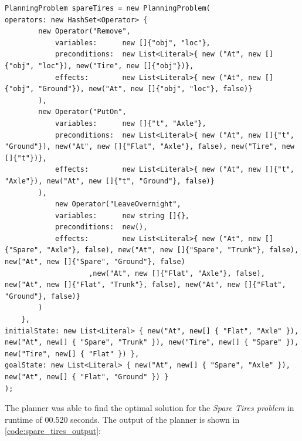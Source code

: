 \begin{lstlisting}[language={[Sharp]C}, frame=single, basicstyle=\small\ttfamily, breaklines=true, captionpos=b, caption={Spare Tires Problem Input to the Planner}, label={code:spare_tires_input}]
PlanningProblem spareTires = new PlanningProblem(
operators: new HashSet<Operator> {
        new Operator("Remove",
            variables:      new []{"obj", "loc"},
            preconditions:  new List<Literal>{ new ("At", new []{"obj", "loc"}), new("Tire", new []{"obj"})},
            effects:        new List<Literal>{ new ("At", new []{"obj", "Ground"}), new("At", new []{"obj", "loc"}, false)}
        ),
        new Operator("PutOn",
            variables:      new []{"t", "Axle"},
            preconditions:  new List<Literal>{ new ("At", new []{"t", "Ground"}), new("At", new []{"Flat", "Axle"}, false), new("Tire", new []{"t"})},
            effects:        new List<Literal>{ new ("At", new []{"t", "Axle"}), new("At", new []{"t", "Ground"}, false)}
        ),
            new Operator("LeaveOvernight",
            variables:      new string []{},
            preconditions:  new(),
            effects:        new List<Literal>{ new ("At", new []{"Spare", "Axle"}, false), new("At", new []{"Spare", "Trunk"}, false), new("At", new []{"Spare", "Ground"}, false)
                    ,new("At", new []{"Flat", "Axle"}, false), new("At", new []{"Flat", "Trunk"}, false), new("At", new []{"Flat", "Ground"}, false)}
        )
    },
initialState: new List<Literal> { new("At", new[] { "Flat", "Axle" }), new("At", new[] { "Spare", "Trunk" }), new("Tire", new[] { "Spare" }), new("Tire", new[] { "Flat" }) },
goalState: new List<Literal> { new("At", new[] { "Spare", "Axle" }), new("At", new[] { "Flat", "Ground" }) }
);
\end{lstlisting}

The planner was able to find the optimal solution for the \textit{Spare Tires problem} in runtime of 00.520 seconds. The output of the planner is shown in \autoref{code:spare_tires_output}:

